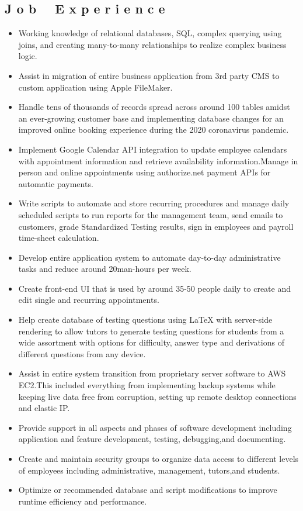 \documentclass[2pt]{resume}
\begin{document}
\subsection{J o b \ \ E x p e r i e n c e}
\begin{itemize}
\item \small Working knowledge of relational databases, SQL, complex querying using joins, and creating many-to-many relationships to realize complex business logic.
\item \small Assist in migration of entire business application from 3rd party CMS to custom application using Apple FileMaker.
\item \small Handle tens of thousands of records spread across around 100 tables amidst an ever-growing customer base and implementing database changes for an improved online booking experience during the 2020 coronavirus pandemic.
\item \small Implement Google Calendar API integration to update employee calendars with appointment information and retrieve availability information.Manage in person and online appointments using authorize.net payment APIs for automatic payments.
\item \small Write scripts to automate and store recurring procedures and manage daily scheduled scripts to run reports for the management team, send emails to customers, grade Standardized Testing results, sign in employees and payroll time-sheet calculation.
\item \small Develop entire application system to automate day-to-day administrative tasks and reduce around 20man-hours per week.
\item \small Create front-end UI that is used by around 35-50 people daily to create and edit single and recurring appointments.
\item \small Help create database of testing questions using LaTeX with server-side rendering to allow tutors to generate testing questions for students from a wide assortment with options for difficulty, answer type and derivations of different questions from any device.
\item \small Assist in entire system transition from proprietary server software to AWS EC2.This included everything from implementing backup systems while keeping live data free from corruption, setting up remote desktop connections and elastic IP.
\item \small Provide support in all aspects and phases of software development including application and feature development, testing, debugging,and documenting.
\item \small Create and maintain security groups to organize data access to different levels of employees including administrative, management, tutors,and students.
\item \small Optimize or recommended database and script modifications to improve runtime efficiency and performance.
\end{itemize}
\end{document}
